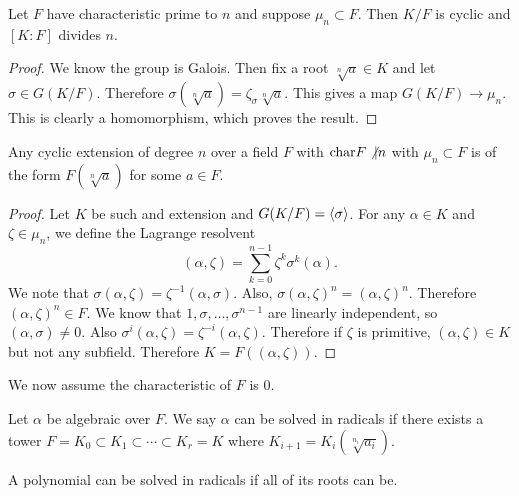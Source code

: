 \documentclass[10pt, twoside]{article}
\begin{document}
        \begin{prop} Let $F$ have characteristic prime to $n$ and suppose
            $\mu_n \subset F$. Then $K/F$ is cyclic and $[K:F]$ divides $n$.
            \begin{proof} We know the group is Galois. Then fix a root
                $\sqrt[n]{a} \in K$ and let $\sigma \in G(K/F)$. Therefore
                $\sigma(\sqrt[n]{a}) = \zeta_{\sigma}\sqrt[n]{a}$. This gives a
                map $G(K/F) \to \mu_n$. This is clearly a homomorphism, which
                proves the result.  \end{proof} \end{prop}

        \begin{prop} Any cyclic extension of degree $n$ over a field $F$ with
            $\mathrm{char} F \not\vert n$ with $\mu_n \subset F$ is of the form
            $F(\sqrt[n]{a})$ for some $a \in F$.  \begin{proof} Let $K$ be such
                and extension and $G(K/F) = \langle\sigma\rangle$. For any $\alpha \in
                K$ and $\zeta \in \mu_n$, we define the Lagrange resolvent
                \[(\alpha, \zeta) = \sum_{k=0}^{n-1} \zeta^k \sigma^k(\alpha).
                \] We note that $\sigma(\alpha, \zeta) = \zeta^{-1}(\alpha,
                \sigma)$. Also, $\sigma (\alpha, \zeta)^n = (\alpha, \zeta)^n$.
                Therefore $(\alpha, \zeta)^n \in F$. We know that $1, \sigma,
                \ldots, \sigma^{n-1}$ are linearly independent, so $(\alpha,
                \sigma) \neq 0$. Also $\sigma^i(\alpha, \zeta) =
                \zeta^{-i}(\alpha, \zeta)$. Therefore if $\zeta$ is primitive,
                $(\alpha, \zeta) \in K$ but not any subfield. Therefore $K =
                F((\alpha, \zeta))$.  \end{proof} \end{prop}

        We now assume the characteristic of $F$ is $0$.

        \begin{defn} Let $\alpha$ be algebraic over
            $F$. We say $\alpha$ can be solved in radicals if there exists a
            tower $F = K_0 \subset K_1 \subset \cdots \subset K_r = K$ where
            $K_{i+1}=K_i(\sqrt[n_i]{a_i})$.  \end{defn}
        
        \begin{defn} A polynomial can be solved in radicals if all of its roots
        can be.  \end{defn}
\end{document}
